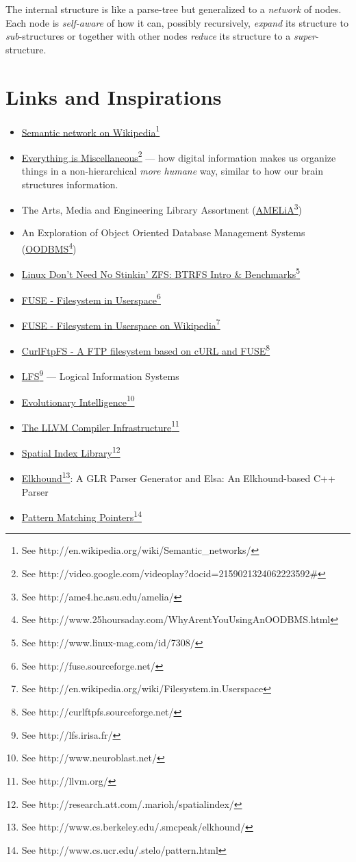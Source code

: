 \documentclass[a4paper,10pt,twocolumn]{article}
\newcommand{\hrefn}[2]{\href{#1}{#2}\footnote{See {\texttt #1}}} %
\begin{document}
The internal structure is like a parse-tree but generalized to a \emph{network}
of nodes.  Each node is \emph{self-aware} of how it can, possibly recursively,
\emph{expand} its structure to \emph{sub}-structures or together with other
nodes \emph{reduce} its structure to a \emph{super}-structure.

\section{Links and Inspirations}

\begin{itemize}
\item \hrefn{http://en.wikipedia.org/wiki/Semantic_networks/}{Semantic network
    on Wikipedia}
\item
  \hrefn{http://video.google.com/videoplay?docid=2159021324062223592\#}{Everything
    is Miscellaneous} --- how digital information makes us organize things in a
  non-hierarchical \emph{more humane} way, similar to how our brain structures
  information.
\item The Arts, Media and Engineering Library Assortment
  (\hrefn{http://ame4.hc.asu.edu/amelia/}{AMELiA})
\item An Exploration of Object Oriented Database Management Systems
  (\hrefn{http://www.25hoursaday.com/WhyArentYouUsingAnOODBMS.html}{OODBMS})
\item \hrefn{http://www.linux-mag.com/id/7308/}{Linux Don't Need No Stinkin'
    ZFS: BTRFS Intro \& Benchmarks}
\item \hrefn{http://fuse.sourceforge.net/}{FUSE - Filesystem in Userspace}
\item \hrefn{http://en.wikipedia.org/wiki/Filesystem.in.Userspace}{FUSE -
    Filesystem in Userspace on Wikipedia}
\item \hrefn{http://curlftpfs.sourceforge.net/}{CurlFtpFS - A FTP filesystem based on cURL and FUSE}
\item \hrefn{http://lfs.irisa.fr/}{LFS} --- Logical Information Systems
\item \hrefn{http://www.neuroblast.net/}{Evolutionary Intelligence}
\item \hrefn{http://llvm.org/}{The LLVM Compiler Infrastructure}
\item \hrefn{http://research.att.com/.marioh/spatialindex/}{Spatial Index Library}
\item \hrefn{http://www.cs.berkeley.edu/.smcpeak/elkhound/}{Elkhound}: A GLR
  Parser Generator and Elsa: An Elkhound-based C++ Parser
\item \hrefn{http://www.cs.ucr.edu/.stelo/pattern.html}{Pattern Matching Pointers}

\end{itemize}
\end{document}
